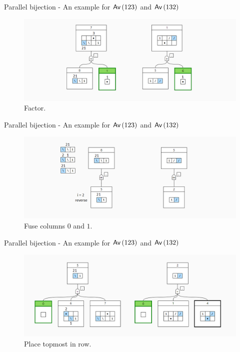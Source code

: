 \begin{frame}{Parallel bijection - An example for $\textsf{Av}\left(123\right)$ and $\textsf{Av}\left(132\right)$}
    \begin{figure}
        \centering
        \includegraphics[scale=0.4]{graphics/step05.png}
        \caption{Factor.}
    \end{figure}
\end{frame}


\begin{frame}{Parallel bijection - An example for $\textsf{Av}\left(123\right)$ and $\textsf{Av}\left(132\right)$}
    \begin{figure}
        \centering
        \includegraphics[scale=0.4]{graphics/step06.png}
        \caption{Fuse columns $0$ and $1$.}
    \end{figure}
\end{frame}

\begin{frame}{Parallel bijection - An example for $\textsf{Av}\left(123\right)$ and $\textsf{Av}\left(132\right)$}
    \begin{figure}
        \centering
        \includegraphics[scale=0.4]{graphics/step07.png}
        \caption{Place topmost in row.}
    \end{figure}
\end{frame}


